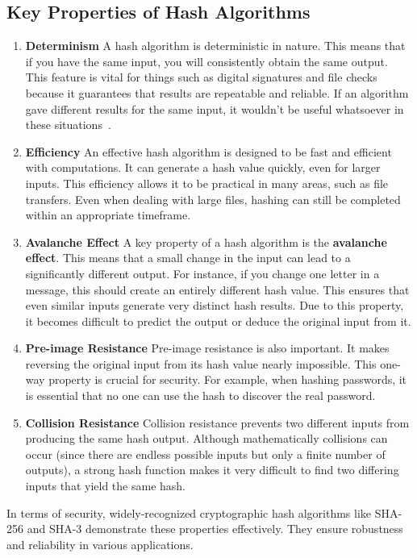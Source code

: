 \documentclass[11pt,a4paper]{article}
\begin{document}
    \subsection*{Key Properties of Hash Algorithms}
        \begin{enumerate}
            \item \textbf{Determinism}
            \newline
            A hash algorithm is deterministic in nature. This means that if you have the same input, you will consistently obtain the same output. This feature is vital for things such as digital signatures and file checks because it guarantees that results are repeatable and reliable. If an algorithm gave different results for the same input, it wouldn’t be useful whatsoever in these situations~\cite{Properties}.

            \item \textbf{Efficiency}
            \newline
            An effective hash algorithm is designed to be fast and efficient with computations. It can generate a hash value quickly, even for larger inputs. This efficiency allows it to be practical in many areas, such as file transfers. Even when dealing with large files, hashing can still be completed within an appropriate timeframe.

            \item \textbf{Avalanche Effect}
            \newline
            A key property of a hash algorithm is the \textbf{avalanche effect}. This means that a small change in the input can lead to a significantly different output. For instance, if you change one letter in a message, this should create an entirely different hash value. This ensures that even similar inputs generate very distinct hash results. Due to this property, it becomes difficult to predict the output or deduce the original input from it.

            \item \textbf{Pre-image Resistance}
            \newline
            Pre-image resistance is also important. It makes reversing the original input from its hash value nearly impossible. This one-way property is crucial for security. For example, when hashing passwords, it is essential that no one can use the hash to discover the real password.

            \item \textbf{Collision Resistance}
            \newline
            Collision resistance prevents two different inputs from producing the same hash output. Although mathematically collisions can occur (since there are endless possible inputs but only a finite number of outputs), a strong hash function makes it very difficult to find two differing inputs that yield the same hash.

        \end{enumerate}
        In terms of security, widely-recognized cryptographic hash algorithms like SHA-256 and SHA-3 demonstrate these properties effectively. They ensure robustness and reliability in various applications.
\end{document}
